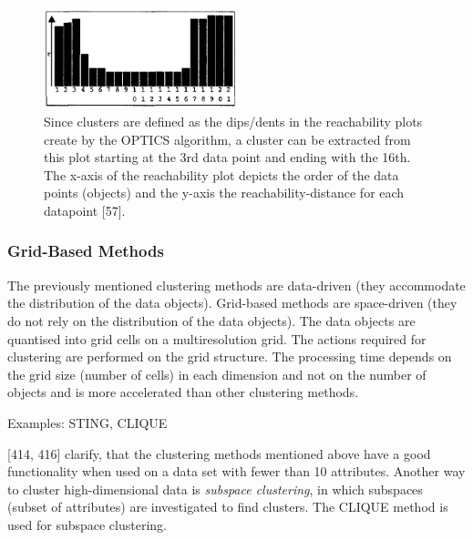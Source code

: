\begin{figure}[h]
  \centering
  \includegraphics[width=0.5\textwidth]{./images/clusterExtractionOPTICS.png}
  \caption{Since clusters are defined as the dips/dents in the reachability plots create by the OPTICS algorithm, a cluster can be extracted from this plot starting at the 3rd data point and ending with the 16th. The x-axis of the reachability plot depicts the order of the data points (objects) and the y-axis the reachability-distance for each datapoint \autocite{OPTICS}[57].}
  \label{figure:clusterExtractionOPTICS}
\end{figure}


 

  \subsubsection{Grid-Based Methods}
  The previously mentioned clustering methods are data-driven (they accommodate the distribution of the data objects). Grid-based methods are space-driven (they do not rely on the distribution of the data objects). The data objects are quantised into grid cells on a multiresolution grid. The actions required for clustering are performed on the grid structure. The processing time depends on the grid size (number of cells) in each dimension and not on the number of objects and is more accelerated than other clustering methods.
  
  Examples: STING, CLIQUE

  \vspace{5mm} %
\textcite{han2011data}[414, 416] clarify, that the clustering methods mentioned above have a good functionality when used on a data set with fewer than 10 attributes. Another way to cluster high-dimensional data is \textit{subspace clustering}, in which subspaces (subset of attributes) are investigated to find clusters. The CLIQUE method is used for subspace clustering. 


